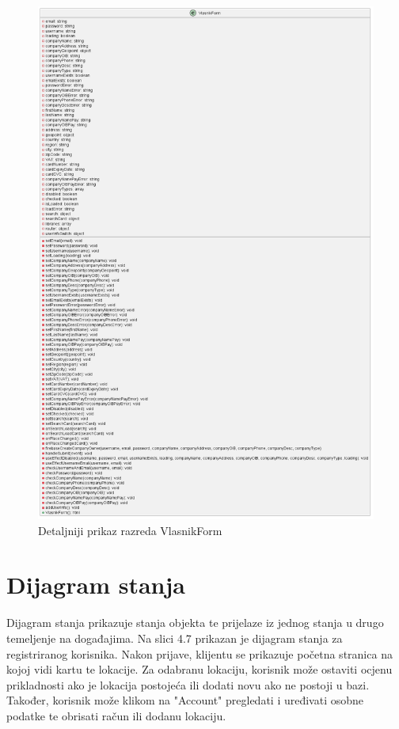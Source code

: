             \begin{figure}[H]
			\includegraphics[scale=0.35]{slike/VlasnikForm.png}
			\centering
			\caption{Detaljniji prikaz razreda VlasnikForm}
			\label{fig:promjene}
		          \end{figure}
            
			\section{Dijagram stanja}

			Dijagram stanja prikazuje stanja objekta te prijelaze iz jednog stanja u drugo temeljenje na događajima. Na slici 4.7 prikazan je dijagram stanja za registriranog korisnika. Nakon prijave, klijentu se prikazuje početna stranica na kojoj vidi kartu te lokacije. Za odabranu lokaciju, korisnik može ostaviti ocjenu prikladnosti ako je lokacija postojeća ili dodati novu ako ne postoji u bazi. Također, korisnik može klikom na "Account" pregledati i uređivati osobne podatke te obrisati račun ili dodanu lokaciju. 

